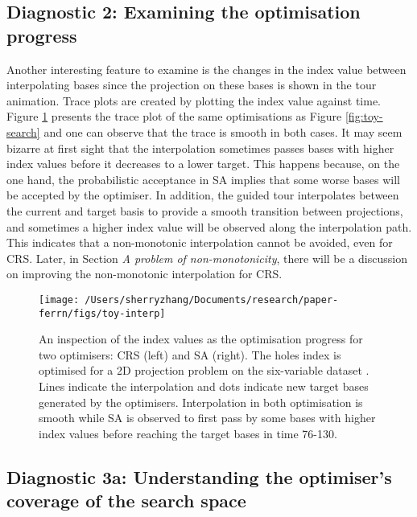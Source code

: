 \hypertarget{toy-interp}{%
\subsection{Diagnostic 2: Examining the optimisation
progress}\label{toy-interp}}

Another interesting feature to examine is the changes in the index value
between interpolating bases since the projection on these bases is shown
in the tour animation. Trace plots are created by plotting the index
value against time. Figure \ref{fig:toy-interp} presents the trace plot
of the same optimisations as Figure \ref{fig:toy-search} and one can
observe that the trace is smooth in both cases. It may seem bizarre at
first sight that the interpolation sometimes passes bases with higher
index values before it decreases to a lower target. This happens
because, on the one hand, the probabilistic acceptance in SA implies
that some worse bases will be accepted by the optimiser. In addition,
the guided tour interpolates between the current and target basis to
provide a smooth transition between projections, and sometimes a higher
index value will be observed along the interpolation path. This
indicates that a non-monotonic interpolation cannot be avoided, even for
CRS. Later, in Section \emph{A problem of non-monotonicity}, there will
be a discussion on improving the non-monotonic interpolation for CRS.

\begin{Schunk}
\begin{figure}

{\centering \texttt{[image: /Users/sherryzhang/Documents/research/paper-ferrn/figs/toy-interp]} 

}

\caption[An inspection of the index values as the optimisation progress for two optimisers]{An inspection of the index values as the optimisation progress for two optimisers: CRS (left) and SA (right). The holes index is optimised for a 2D projection problem on the six-variable dataset . Lines indicate the interpolation and dots indicate new target bases generated by the optimisers. Interpolation in both optimisation is smooth while SA is observed to first pass by some bases with higher index values before reaching the target bases in time 76-130.}\label{fig:toy-interp}
\end{figure}
\end{Schunk}

\hypertarget{toy-pca}{%
\subsection{Diagnostic 3a: Understanding the optimiser's coverage of the
search space}\label{toy-pca}}

